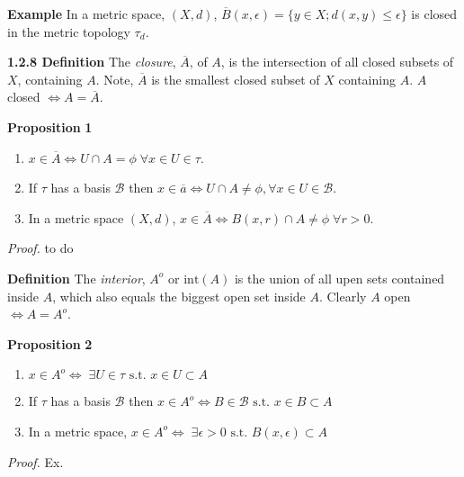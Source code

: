 \documentclass[12pt]{article}
\newcommand{\st}[0]{ \textrm{ s.t. } }
\newcommand{\lrimply}[0] { \Leftrightarrow }
\newcommand{\eps}[0] {  \epsilon }
\newcommand{\B}[0] { \mathcal{B} }
\begin{document}
\begin{flushleft}
 { \bf Example }In a metric space, $(X, d)$, $\overline{B}(x, \eps) = \{ y \in X; d(x,y) \le \eps \}$ is closed in the metric topology $\tau_d$.\end{flushleft}\begin{flushleft} 
 { \bf 1.2.8 Definition }The \emph{closure}, $\overline{A}$, of $A$, is the intersection of all closed subsets of $X$, containing $A$.
        Note, $\overline{A}$ is the smallest closed subset of $X$ containing $A$. $A$ closed $\lrimply A = \overline{A}$.\end{flushleft}\begin{flushleft} 
 { \bf Proposition }{ \bf 1 }\begin{enumerate}
\item
                $x \in \overline{A} \lrimply U \cap A = \phi \; \forall x \in U \in \tau$.
            \item
                If $\tau$ has a basis $\B$ then $x \in \overline{a} \lrimply U \cap A \not = \phi, \forall x \in U \in \B$.
            \item
                In a metric space $(X, d)$, $x \in \overline{A} \lrimply B(x, r) \cap A \not = \phi \; \forall r>0$.
            \end{enumerate}\begin{flushleft} 
 \emph{Proof.  }to do\end{flushleft}\end{flushleft}\begin{flushleft} 
 { \bf Definition }The \emph{interior}, $A^o$ or $\textrm{int}(A)$ is the union of all upen sets contained inside $A$, which also equals the biggest open set inside $A$. Clearly $A$ open $\lrimply A = A^o$.\end{flushleft}\begin{flushleft} 
 { \bf Proposition }{ \bf 2 }\begin{enumerate}
\item
                $x \in A^o \lrimply \; \exists U \in \tau \st x \in U \subset A$
            \item
                If $\tau$ has a basis $\B$ then $x \in A^o \lrimply B \in \B \st x \in B \subset A$
            \item
                In a metric space, $x \in A^o \lrimply \; \exists \eps > 0 \st B(x, \eps) \subset A$
            \end{enumerate}\begin{flushleft} 
 \emph{Proof.  }Ex.\end{flushleft}\end{flushleft}\begin{flushleft} 

\end{flushleft}
\end{document}

